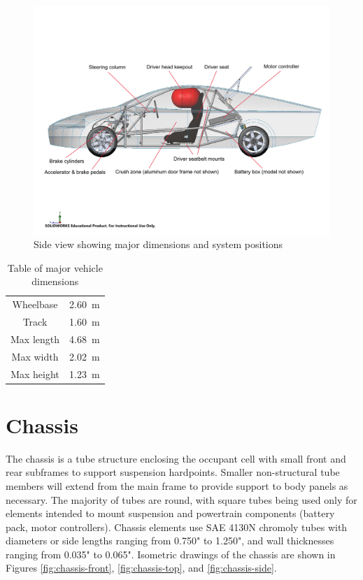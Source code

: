 \documentclass[10pt]{article}
\begin{document}
\begin{figure}[H]
\centering
\includegraphics[width=\textwidth]{figures/msxii-side-view-annotated}
\caption{Side view showing major dimensions and system positions}
\label{fig:msxii-side-view-annotated}
\end{figure}

\begin{table}[H]
\centering
\begin{tabular}{cc}
\toprule
Wheelbase    & \SI{2.60}{\metre}    \\
Track        & \SI{1.60}{\metre}    \\
Max length   & \SI{4.68}{\metre}    \\
Max width    & \SI{2.02}{\metre}    \\
Max height   & \SI{1.23}{\metre}    \\
\bottomrule
\end{tabular}
\caption{Table of major vehicle dimensions}
\label{tab:msxii-dimensions}
\end{table}

\section{Chassis}
The chassis is a tube structure enclosing the occupant cell with small front and rear subframes to support suspension hardpoints. Smaller non-structural tube members will extend from the main frame to provide support to body panels as necessary. The majority of tubes are round, with square tubes being used only for elements intended to mount suspension and powertrain components (battery pack, motor controllers). Chassis elements use SAE 4130N chromoly tubes with diameters or side lengths ranging from 0.750" to 1.250", and wall thicknesses ranging from 0.035" to 0.065". Isometric drawings of the chassis are shown in Figures \ref{fig:chassis-front}, \ref{fig:chassis-top}, and \ref{fig:chassis-side}.
\end{document}
